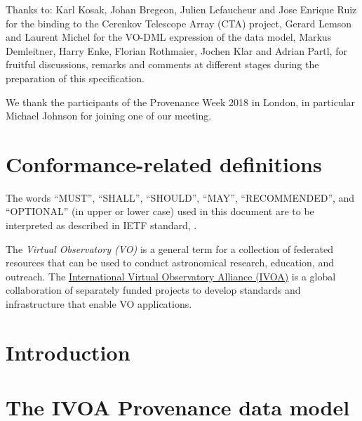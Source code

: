 \documentclass[11pt,a4paper]{ivoa}
\begin{document}
Thanks to: Karl Kosak, Johan Bregeon, Julien Lefaucheur and Jose Enrique Ruiz 
for the binding to the Cerenkov Telescope Array (CTA) project, Gerard
Lemson and Laurent Michel for the VO-DML expression of the data model, Markus Demleitner,
Harry Enke, Florian Rothmaier, Jochen Klar and Adrian Partl,
for fruitful discussions, remarks and comments at different stages during the preparation of this specification.

We thank the participants of the Provenance Week 2018 in London, in particular Michael Johnson for joining one of our meeting.

\section*{Conformance-related definitions}

The words ``MUST'', ``SHALL'', ``SHOULD'', ``MAY'', ``RECOMMENDED'', and
``OPTIONAL'' (in upper or lower case) used in this document are to be
interpreted as described in IETF standard, \citet{std:RFC2119}.

The \emph{Virtual Observatory (VO)} is
a general term for a collection of federated resources that can be used
to conduct astronomical research, education, and outreach.
The \href{http://www.ivoa.net}{International
Virtual Observatory Alliance (IVOA)} is a global
collaboration of separately funded projects to develop standards and
infrastructure that enable VO applications.

\section{Introduction}
\label{sec:intro}





\section{The IVOA Provenance data model}
\label{sec:datamodel}


%
%
\end{document}
